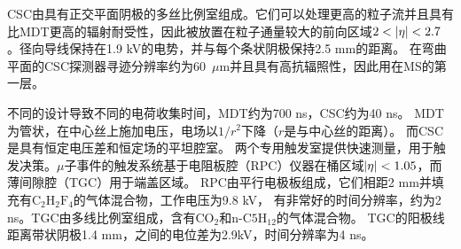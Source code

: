 CSC由具有正交平面阴极的多丝比例室组成。它们可以处理更高的粒子流并且具有比MDT更高的辐射耐受性，因此被放置在粒子通量较大的前向区域$2<\abseta<2.7$。径向导线保持在1.9 kV的电势，并与每个条状阴极保持2.5 mm的距离。
在弯曲平面的CSC探测器寻迹分辨率约为60~$\mu\text{m}$并且具有高抗辐照性，因此用在MS的第一层。

不同的设计导致不同的电荷收集时间，MDT约为700 ns，CSC约为40 ns。
MDT为管状，在中心丝上施加电压，电场以$1/r^{2}$下降（$r$是与中心丝的距离）。
而CSC是具有恒定电压差和恒定场的平坦腔室。
两个专用触发室提供快速测量，用于触发决策。$\mu$子事件的触发系统基于电阻板腔（RPC）\cite{Aielli:2006hg}仪器在桶区域$|\eta|<1.05$，而薄间隙腔（TGC）\cite{Majewski:1984ag}用于端盖区域。 
RPC由平行电极板组成，它们相距2 mm并填充有$\text{C}_{2}\text{H}_{2}\text{F}_{4}$的气体混合物，工作电压为9.8 kV，
有非常好的时间分辨率，约为2 ns。TGC由多线比例室组成，含有$\text{CO}_{2}$和$\text{n-C5H}_{12}$的气体混合物。
TGC的阳极线距离带状阴极1.4 mm，之间的电位差为2.9kV，时间分辨率为4 ns。
